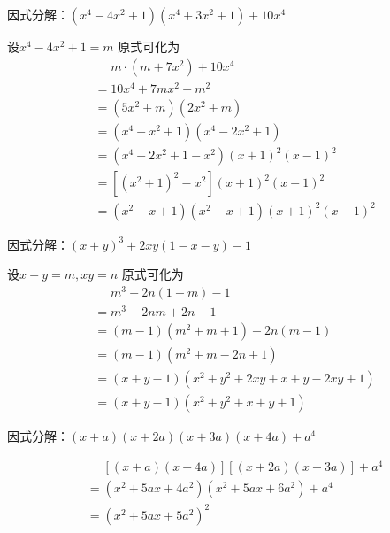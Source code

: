 \documentclass[windows,csize4]{BHCexam}
\begin{document}
\begin{groups}
\begin{questions}[]
        \question[5] 因式分解：$(x^4-4x^2+1)(x^4+3x^2+1)+10x^4$
        \begin{solution}{0.5cm}
            \methodonly 设$x^4-4x^2+1=m$ 原式可化为
            \[
                \begin{aligned}
                     & \phantom{=}m\cdot (m+7x^2)+10x^4   \\
                     & = 10x^4 + 7mx^2 + m^2              \\
                     & = (5x^2+m)(2x^2+m)                 \\
                     & = (x^4 + x^2+1)(x^4-2x^2+1)        \\
                     & = (x^4+2x^2+1-x^2)(x+1)^2(x-1)^2   \\
                     & = [(x^2+1)^2 -x^2](x+1)^2(x-1)^2   \\
                     & = (x^2+x+1)(x^2-x+1)(x+1)^2(x-1)^2
                \end{aligned}
            \]
        \end{solution}
        \vspace{3.5cm}


        \question[5] 因式分解：$(x+y)^3+2xy(1-x-y)-1$
        \begin{solution}{0.5cm}
            \methodonly 设$x+y=m,xy=n$ 原式可化为
            \[
                \begin{aligned}
                     & \phantom{=}m^3+2n(1-m)-1         \\
                     & = m^3-2nm+2n-1                   \\
                     & = (m-1)(m^2+m+1) -2n(m-1)        \\
                     & = (m-1)(m^2+m-2n+1)              \\
                     & = (x+y-1)(x^2+y^2+2xy+x+y-2xy+1) \\
                     & = (x+y-1)(x^2+y^2+x+y+1)
                \end{aligned}
            \]
        \end{solution}
        \vspace{3.5cm}

        \question[5] 因式分解：$(x+a)(x+2a)(x+3a)(x+4a)+a^4$
        \begin{solution}{0.5cm}
            \methodonly
            \[
                \begin{aligned}
                     & \phantom{=}[(x+a)(x+4a)][(x+2a)(x+3a)] + a^4 \\
                     & = (x^2+5ax+4a^2)(x^2+5ax+6a^2)+a^4           \\
                     & = (x^2+5ax+5a^2)^2
                \end{aligned}
            \]
        \end{solution}
        \vspace{3.5cm}


\end{questions}
\end{groups}
\end{document}
